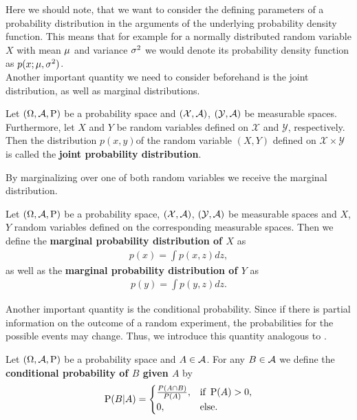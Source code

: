 Here we should note, that we want to consider the defining parameters of a probability distribution in the arguments of the underlying probability density function. This means that for example for a normally distributed random variable $X$ with mean $\operatorname{\mu}$ and variance $\operatorname{\sigma}^2$ we would denote its probability density function as $p(x;\operatorname{\mu},\operatorname{\sigma}^2)$.\\
Another important quantity we need to consider beforehand is the joint distribution, as well as marginal distributions.

\begin{definition}\label{def:joint_pdf}
Let $(\Omega, \operatorname{\mathcal{A}}, \operatorname{\text{P}})$ be a probability space and $(\mathcal{X}, \operatorname{\mathcal{A}})$, $(\mathcal{Y}, \operatorname{\mathcal{A}})$ be measurable spaces. Furthermore, let $X$ and $Y$ be random variables defined on $\mathcal{X}$ and $\mathcal{Y}$, respectively. Then the distribution $p(x,y) $of the random variable $(X, Y)$ defined on $\mathcal{X} \times \mathcal{Y}$ is called the \textbf{joint probability distribution}.
\end{definition}

By marginalizing over one of both random variables we receive the marginal distribution.

\begin{definition}
Let $(\Omega, \operatorname{\mathcal{A}}, \operatorname{\text{P}})$ be a probability space, $(\mathcal{X}, \operatorname{\mathcal{A}})$, $(\mathcal{Y}, \operatorname{\mathcal{A}})$ be measurable spaces and $X$, $Y$ random variables defined on the corresponding measurable spaces. Then we define the \textbf{marginal probability distribution of $X$} as
\begin{align*}
p(x) = \int p(x,z) dz,
\end{align*}
as well as the \textbf{marginal probability distribution of $Y$} as
\begin{align*}
p(y) = \int p(y,z) dz.
\end{align*}
\end{definition}

Another important quantity is the conditional probability. Since if there is partial information on the outcome of a random experiment, the probabilities for the possible events may change. Thus, we introduce this quantity analogous to \cite[Chapter~8]{klenke2013probability}.

\begin{definition}\label{def:cond_prob}
Let $(\Omega, \operatorname{\mathcal{A}}, \operatorname{\text{P}})$ be a probability space and $A\in\operatorname{\mathcal{A}}$. For any $B\in\operatorname{\mathcal{A}}$ we define the \textbf{conditional probability of $B$ given $A$} by
\begin{align*}
\operatorname{\text{P}}(B | A) =
\begin{cases}
\frac{P(A\cap B)}{P(A)}, &\text{if }\operatorname{\text{P}}(A)>0,\\
0, &\text{else}.
\end{cases}
\end{align*}
\end{definition}

